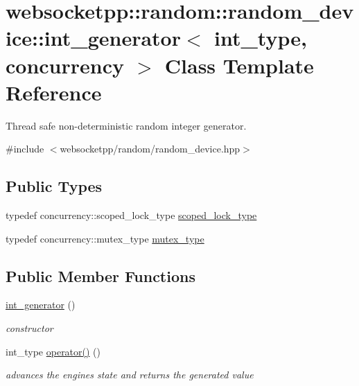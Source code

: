 \hypertarget{classwebsocketpp_1_1random_1_1random__device_1_1int__generator}{}\section{websocketpp\+:\+:random\+:\+:random\+\_\+device\+:\+:int\+\_\+generator$<$ int\+\_\+type, concurrency $>$ Class Template Reference}
\label{classwebsocketpp_1_1random_1_1random__device_1_1int__generator}


Thread safe non-\/deterministic random integer generator.  




{\ttfamily \#include $<$websocketpp/random/random\+\_\+device.\+hpp$>$}

\subsection*{Public Types}
\begin{DoxyCompactItemize}
\item 
typedef concurrency\+::scoped\+\_\+lock\+\_\+type \hyperlink{classwebsocketpp_1_1random_1_1random__device_1_1int__generator_a7702456f8c753025bb52db190bfa04b3}{scoped\+\_\+lock\+\_\+type}
\item 
typedef concurrency\+::mutex\+\_\+type \hyperlink{classwebsocketpp_1_1random_1_1random__device_1_1int__generator_a76479f1088f245508e7efce66b3ab51c}{mutex\+\_\+type}
\end{DoxyCompactItemize}
\subsection*{Public Member Functions}
\begin{DoxyCompactItemize}
\item 
\hyperlink{classwebsocketpp_1_1random_1_1random__device_1_1int__generator_ac1752f1f3cb1c3cb6a98e252b6baac8a}{int\+\_\+generator} ()
\begin{DoxyCompactList}\small\item\em constructor \end{DoxyCompactList}\item 
int\+\_\+type \hyperlink{classwebsocketpp_1_1random_1_1random__device_1_1int__generator_a6e4fea3c83b876cc364f9d9370b0c5a1}{operator()} ()
\begin{DoxyCompactList}\small\item\em advances the engine\textquotesingle{}s state and returns the generated value \end{DoxyCompactList}\end{DoxyCompactItemize}


